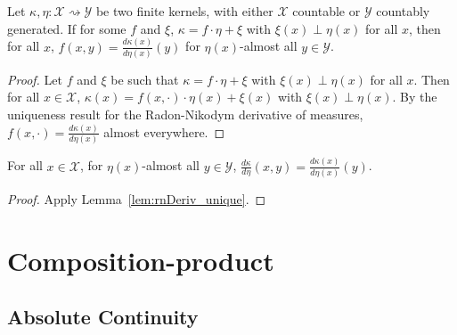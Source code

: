 \begin{lemma}
  \label{lem:rnDeriv_unique}
  \mathlibok
  Let $\kappa, \eta : \mathcal X \rightsquigarrow \mathcal Y$ be two finite kernels, with either $\mathcal X$ countable or $\mathcal{Y}$ countably generated. If for some $f$ and $\xi$, $\kappa = f \cdot \eta + \xi$ with $\xi(x) \perp \eta(x)$ for all $x$, then for all $x$, $f(x, y) = \frac{d \kappa(x)}{d \eta(x)}(y)$ for $\eta(x)$-almost all $y \in \mathcal Y$.
\end{lemma}

\begin{proof}\mathlibok
Let $f$ and $\xi$ be such that $\kappa = f \cdot \eta + \xi$ with $\xi(x) \perp \eta(x)$ for all $x$. Then for all $x \in \mathcal X$, $\kappa(x) = f(x, \cdot) \cdot \eta(x) + \xi(x)$ with $\xi(x) \perp \eta(x)$. By the uniqueness result for the Radon-Nikodym derivative of measures, $f(x, \cdot) = \frac{d \kappa(x)}{d \eta(x)}$ almost everywhere.
\end{proof}


\begin{corollary}
  \label{cor:rnDeriv_value}
  \mathlibok
  For all $x \in \mathcal X$, for $\eta(x)$-almost all $y \in \mathcal Y$, $\frac{d \kappa}{d \eta}(x, y) = \frac{d \kappa(x)}{d \eta(x)}(y)$.
\end{corollary}

\begin{proof}\mathlibok
{}
Apply Lemma~\ref{lem:rnDeriv_unique}.
\end{proof}



\section{Composition-product}

\subsection{Absolute Continuity}

